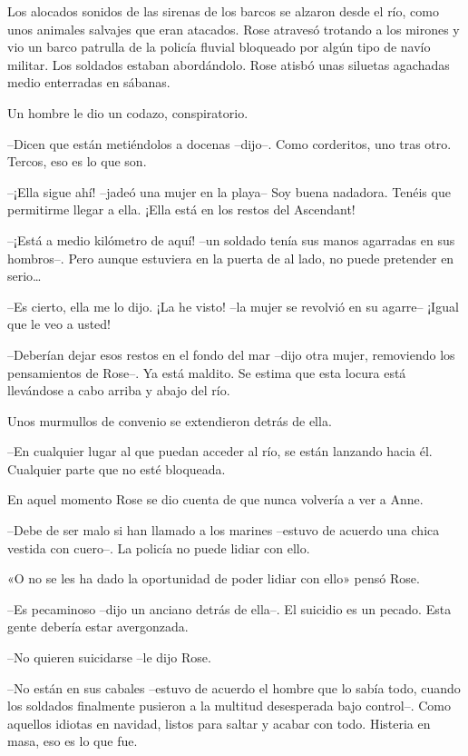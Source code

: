 {Los alocados sonidos de las sirenas de los barcos se alzaron desde el
 río, como unos animales salvajes que eran atacados. Rose atravesó
 trotando a los mirones y vio un barco patrulla de la policía fluvial
 bloqueado por algún tipo de navío militar. Los soldados estaban
 abordándolo. Rose atisbó unas siluetas agachadas medio enterradas en
sábanas.}

{Un hombre le dio un codazo, conspiratorio.}

{--Dicen que están metiéndolos a docenas --dijo--. Como corderitos, uno
tras otro. Tercos, eso es lo que son.}

{--¡Ella sigue ahí! --jadeó una mujer en la playa-- Soy buena nadadora.
 Tenéis que permitirme llegar a ella. ¡Ella está en los restos del
Ascendant!}

{--¡Está a medio kilómetro de aquí! --un soldado tenía sus manos
 agarradas en sus hombros--. Pero aunque estuviera en la puerta de al
 lado, no puede pretender en serio\ldots{}}

{--Es cierto, ella me lo dijo. ¡La he visto! --la mujer se revolvió en
su agarre-- ¡Igual que le veo a usted!}

{--Deberían dejar esos restos en el fondo del mar --dijo otra mujer,
 removiendo los pensamientos de Rose--. Ya está maldito. Se estima que
esta locura está llevándose a cabo arriba y abajo del río.}

{Unos murmullos de convenio se extendieron detrás de ella.}

{--En cualquier lugar al que puedan acceder al río, se están lanzando
hacia él. Cualquier parte que no esté bloqueada.}

{En aquel momento Rose se dio cuenta de que nunca volvería a ver a
Anne.}

{--Debe de ser malo si han llamado a los marines --estuvo de acuerdo una
chica vestida con cuero--. La policía no puede lidiar con ello.}

{«O no se les ha dado la oportunidad de poder lidiar con ello» pensó
Rose.}

{--Es pecaminoso --dijo un anciano detrás de ella--. El suicidio es un
pecado. Esta gente debería estar avergonzada.}

{--No quieren suicidarse --le dijo Rose.}

{--No están en sus cabales --estuvo de acuerdo el hombre que lo sabía
 todo, cuando los soldados finalmente pusieron a la multitud desesperada
 bajo control--. Como aquellos idiotas en navidad, listos para saltar y
acabar con todo. Histeria en masa, eso es lo que fue.}

